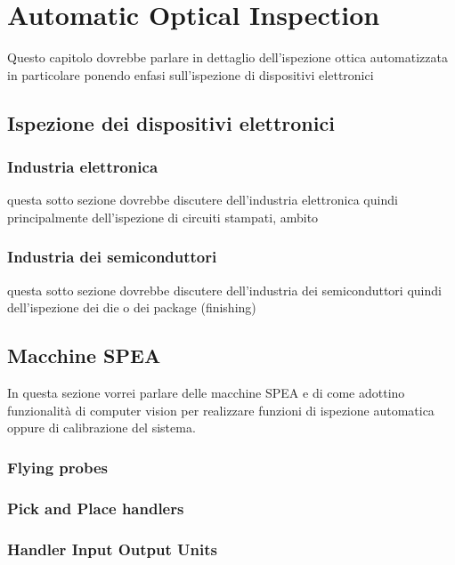 \chapter{Automatic Optical Inspection}
Questo capitolo dovrebbe parlare in dettaglio dell'ispezione
ottica automatizzata in particolare ponendo enfasi sull'ispezione di
dispositivi elettronici
\section{Ispezione dei dispositivi elettronici}
\subsection{Industria elettronica}
questa sotto sezione dovrebbe discutere dell'industria elettronica
quindi principalmente dell'ispezione di circuiti stampati, ambito
\subsection{Industria dei semiconduttori}
questa sotto sezione dovrebbe discutere dell'industria dei semiconduttori
quindi dell'ispezione dei die o dei package (finishing) 
\section{Macchine SPEA}
In questa sezione vorrei parlare delle macchine SPEA e di come adottino
funzionalità di computer vision per realizzare funzioni di ispezione automatica
oppure di calibrazione del sistema.
\subsection{Flying probes}
\subsection{Pick and Place handlers}
\subsection{Handler Input Output Units}

\endinput